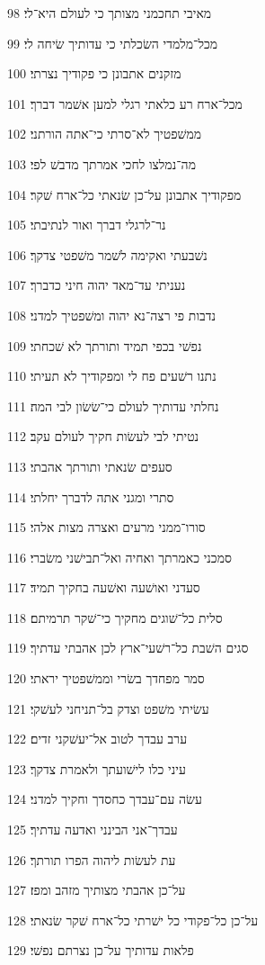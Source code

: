 \par 98 מאיבי תחכמני מצותך כי לעולם היא־לי׃
\par 99 מכל־מלמדי השׂכלתי כי עדותיך שׂיחה לי׃
\par 100 מזקנים אתבונן כי פקודיך נצרתי׃
\par 101 מכל־ארח רע כלאתי רגלי למען אשׁמר דברך׃
\par 102 ממשׁפטיך לא־סרתי כי־אתה הורתני׃
\par 103 מה־נמלצו לחכי אמרתך מדבשׁ לפי׃
\par 104 מפקודיך אתבונן על־כן שׂנאתי כל־ארח שׁקר׃
\par 105 נר־לרגלי דברך ואור לנתיבתי׃
\par 106 נשׁבעתי ואקימה לשׁמר משׁפטי צדקך׃
\par 107 נעניתי עד־מאד יהוה חיני כדברך׃
\par 108 נדבות פי רצה־נא יהוה ומשׁפטיך למדני׃
\par 109 נפשׁי בכפי תמיד ותורתך לא שׁכחתי׃
\par 110 נתנו רשׁעים פח לי ומפקודיך לא תעיתי׃
\par 111 נחלתי עדותיך לעולם כי־שׂשׂון לבי המה׃
\par 112 נטיתי לבי לעשׂות חקיך לעולם עקב׃
\par 113 סעפים שׂנאתי ותורתך אהבתי׃
\par 114 סתרי ומגני אתה לדברך יחלתי׃
\par 115 סורו־ממני מרעים ואצרה מצות אלהי׃
\par 116 סמכני כאמרתך ואחיה ואל־תבישׁני משׂברי׃
\par 117 סעדני ואושׁעה ואשׁעה בחקיך תמיד׃
\par 118 סלית כל־שׁוגים מחקיך כי־שׁקר תרמיתם׃
\par 119 סגים השׁבת כל־רשׁעי־ארץ לכן אהבתי עדתיך׃
\par 120 סמר מפחדך בשׂרי וממשׁפטיך יראתי׃
\par 121 עשׂיתי משׁפט וצדק בל־תניחני לעשׁקי׃
\par 122 ערב עבדך לטוב אל־יעשׁקני זדים׃
\par 123 עיני כלו לישׁועתך ולאמרת צדקך׃
\par 124 עשׂה עם־עבדך כחסדך וחקיך למדני׃
\par 125 עבדך־אני הבינני ואדעה עדתיך׃
\par 126 עת לעשׂות ליהוה הפרו תורתך׃
\par 127 על־כן אהבתי מצותיך מזהב ומפז׃
\par 128 על־כן כל־פקודי כל ישׁרתי כל־ארח שׁקר שׂנאתי׃
\par 129 פלאות עדותיך על־כן נצרתם נפשׁי׃
